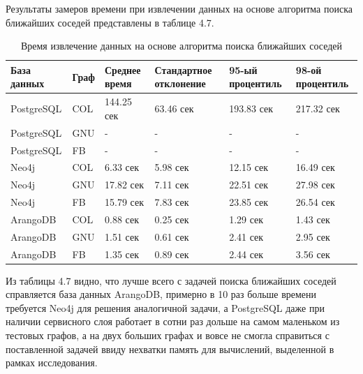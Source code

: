 Результаты замеров времени при извлечении данных на основе алгоритма поиска ближайших соседей представлены в таблице 4.7.

\begin{table} [htbp]
    \centering\small
    \caption{Время извлечение данных на основе алгоритма поиска ближайших соседей}
    \begin{tabular}{|p{3cm}|p{1cm}|p{2cm}|p{2cm}|p{2cm}|p{2cm}|}
        \hline
        База данных & Граф & Среднее время & Стандартное отклонение & 95-ый процентиль & 98-ой процентиль \\ \hline
        PostgreSQL  & COL  & 144.25 сек    & 63.46 сек              & 193.83 сек       & 217.32 сек       \\ \hline
        PostgreSQL  & GNU  & -             & -                      & -                & -                \\ \hline
        PostgreSQL  & FB   & -             & -                      & -                & -                \\ \hline
        Neo4j       & COL  & 6.33 сек      & 5.98 сек               & 12.15 сек        & 16.49 сек        \\ \hline
        Neo4j       & GNU  & 17.82 сек     & 7.11 сек               & 22.51 сек        & 27.98 сек        \\ \hline
        Neo4j       & FB   & 15.79 сек     & 7.83 сек               & 23.85 сек        & 26.54 сек        \\ \hline
        ArangoDB    & COL  & 0.88 сек      & 0.25 сек               & 1.29 сек         & 1.43 сек         \\ \hline
        ArangoDB    & GNU  & 1.51 сек      & 0.61 сек               & 2.41 сек         & 2.95 сек         \\ \hline
        ArangoDB    & FB   & 1.35 сек      & 0.89 сек               & 2.44 сек         & 3.56 сек         \\ \hline
    \end{tabular}
    \normalsize
\end{table}

Из таблицы 4.7 видно, что лучше всего с задачей поиска ближайших соседей справляется база данных ArangoDB, примерно в 10 раз больше времени
требуется Neo4j для решения аналогичной задачи, а PostgreSQL даже при наличии сервисного слоя работает в сотни раз дольше на самом маленьком
из тестовых графов, а на двух больших графах и вовсе не смогла справиться с поставленной задачей ввиду нехватки память для вычислений,
выделенной в рамках исследования.



